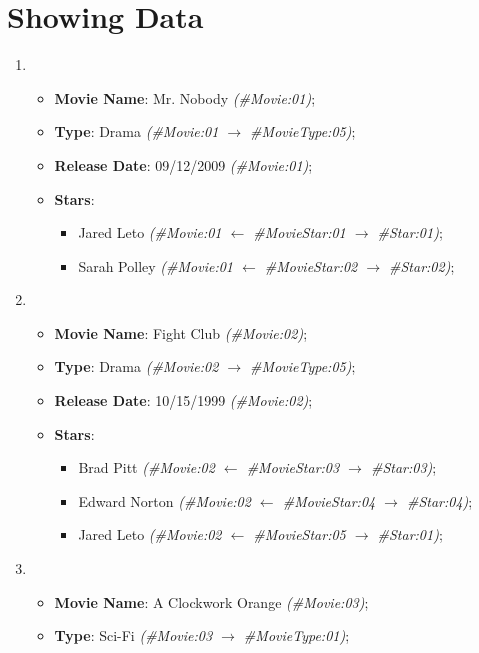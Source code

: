 \section{Showing Data}
	\begin{enumerate}
			\item{%
				\begin{itemize}
					\item{\textbf{Movie Name}: Mr. Nobody \textit{(\#Movie:01)};}
					\item{\textbf{Type}: Drama \textit{(\#Movie:01 $\to$ \#MovieType:05)};}
					\item{\textbf{Release Date}: 09/12/2009 \textit{(\#Movie:01)};}
					\item{\textbf{Stars}:
						\begin{itemize}
							\item{Jared Leto \textit{(\#Movie:01 $\gets$ \#MovieStar:01 $\to$ \#Star:01)};}
							\item{Sarah Polley \textit{(\#Movie:01 $\gets$ \#MovieStar:02 $\to$ \#Star:02)};}
						\end{itemize}}
				\end{itemize}}
			\item{%
				\begin{itemize}
					\item{\textbf{Movie Name}: Fight Club \textit{(\#Movie:02)};}
					\item{\textbf{Type}: Drama \textit{(\#Movie:02 $\to$ \#MovieType:05)};}
					\item{\textbf{Release Date}: 10/15/1999 \textit{(\#Movie:02)};}
					\item{\textbf{Stars}:
						\begin{itemize}
							\item{Brad Pitt \textit{(\#Movie:02 $\gets$ \#MovieStar:03 $\to$ \#Star:03)};}
							\item{Edward Norton \textit{(\#Movie:02 $\gets$ \#MovieStar:04 $\to$ \#Star:04)};}
							\item{Jared Leto \textit{(\#Movie:02 $\gets$ \#MovieStar:05 $\to$ \#Star:01)};}
						\end{itemize}}
				\end{itemize}}
			\item{%
				\begin{itemize}
					\item{\textbf{Movie Name}: A Clockwork Orange \textit{(\#Movie:03)};}
					\item{\textbf{Type}: Sci-Fi \textit{(\#Movie:03 $\to$ \#MovieType:01)};}

\end{itemize}}
\end{enumerate}
